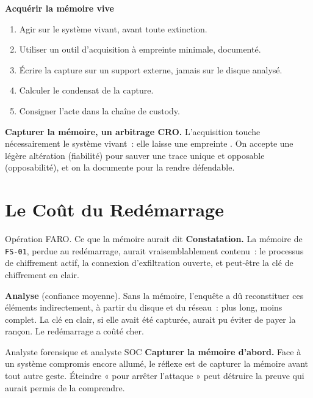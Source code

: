 \begin{boxprocedure}
\textbf{Acquérir la mémoire vive}
\begin{enumerate}
    \item Agir sur le système vivant, avant toute extinction.
    \item Utiliser un outil d'acquisition à empreinte minimale, documenté.
    \item Écrire la capture sur un support externe, jamais sur le disque
          analysé.
    \item Calculer le condensat de la capture.
    \item Consigner l'acte dans la chaîne de custody.
\end{enumerate}
\end{boxprocedure}

\begin{boxCRO}
\textbf{Capturer la mémoire, un arbitrage CRO.} L'acquisition touche
nécessairement le système vivant~: elle laisse une empreinte .
On accepte une légère altération (fiabilité) pour sauver une trace unique et
opposable (opposabilité), et on la documente pour la rendre défendable.
\end{boxCRO}

\section{Le Coût du Redémarrage}
\label{sec:c13-cout}

\begin{boxscenario}{Opération FARO. Ce que la mémoire aurait dit}
\textbf{Constatation.} La mémoire de \texttt{FS-01}, perdue au redémarrage,
aurait vraisemblablement contenu~: le processus de chiffrement actif, la
connexion d'exfiltration ouverte, et peut-être la clé de chiffrement en clair.

\medskip
\textbf{Analyse} (confiance moyenne). Sans la mémoire, l'enquête a dû
reconstituer ces éléments indirectement, à partir du disque et du réseau~:
plus long, moins complet. La clé en clair, si elle avait été capturée, aurait
pu éviter de payer la rançon. Le redémarrage a coûté cher.
\end{boxscenario}

\begin{boxmetier}{Analyste forensique et analyste SOC}
\textbf{Capturer la mémoire d'abord.} Face à un système compromis encore
allumé, le réflexe est de capturer la mémoire avant tout autre geste. Éteindre
« pour arrêter l'attaque » peut détruire la preuve qui aurait permis de la
comprendre.
\end{boxmetier}

